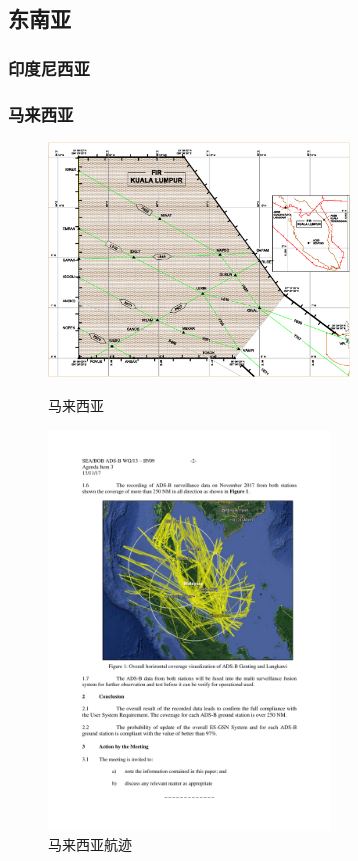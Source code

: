 \subsection{东南亚}

\subsubsection{印度尼西亚}



\subsubsection{马来西亚}

\begin{figure}[htbp]
\centering
\begin{minipage}[t]{0.48\textwidth}
\centering
\includegraphics[width=8cm]{pic/malaysia_cover.png}
\caption{马来西亚}
\label{fig:malaysia_cover}
\end{minipage}
\begin{minipage}[t]{0.48\textwidth}
\centering
\includegraphics[width=7.5cm]{pic/Malaysia.pdf}
\caption{马来西亚航迹}
\label{fig:Malaysia}
\end{minipage}
\end{figure}

